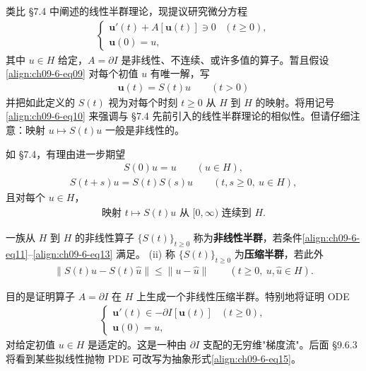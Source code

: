 \documentclass[../../main.tex]{subfiles}
\begin{document}
类比 \S7.4 中阐述的线性半群理论，现提议研究微分方程
\begin{align}
\begin{cases}
\mathbf{u}'(t)+A[\mathbf{u}(t)]\ni 0&(t\geqslant 0),\\
\mathbf{u}(0)=u,
\end{cases}\label{align:ch09-6-eq09}
\end{align}
其中 $u\in H$ 给定，$A=\partial I$ 是非线性、不连续、或许多值的算子。暂且假设\eqref{align:ch09-6-eq09} 对每个初值 $u$ 有唯一解，写
\begin{align}
\mathbf{u}(t)=S(t)u\qquad (t>0)\label{align:ch09-6-eq10}
\end{align}
并把如此定义的 $S(t)$ 视为对每个时刻 $t\geqslant 0$ 从 $H$ 到 $H$ 的映射。将用记号\eqref{align:ch09-6-eq10} 来强调与 \S7.4 先前引入的线性半群理论的相似性。但请仔细注意：映射 $u\mapsto S(t)u$ 一般是非线性的。

如 \S7.4，有理由进一步期望
\begin{align}
S(0)u=u\qquad (u\in H),\label{align:ch09-6-eq11}
\end{align}
\begin{align}
S(t+s)u=S(t)S(s)u\qquad (t,s\geqslant 0,\ u\in H),\label{align:ch09-6-eq12}
\end{align}
且对每个 $u\in H$，
\begin{align}
\text{映射 }t\mapsto S(t)u\text{ 从 }[0,\infty)\text{ 连续到 }H.\label{align:ch09-6-eq13}
\end{align}

\begin{definition}[i]\label{definition:ch09-6-非线性半群} 一族从 $H$ 到 $H$ 的非线性算子 $\{S(t)\}_{t\geqslant 0}$ 称为\textbf{非线性半群}，若条件\eqref{align:ch09-6-eq11}--\eqref{align:ch09-6-eq13} 满足。
(ii) 称 $\{S(t)\}_{t\geqslant 0}$ 为\textbf{压缩半群}，若此外
\begin{align}
\|S(t)u-S(t)\widehat{u}\|\leqslant\|u-\widehat{u}\|\qquad (t\geqslant 0,\ u,\widehat{u}\in H).\label{align:ch09-6-eq14}
\end{align}
\end{definition}

目的是证明算子 $A=\partial I$ 在 $H$ 上生成一个非线性压缩半群。特别地将证明 ODE
\begin{align}
\begin{cases}
\mathbf{u}'(t)\in-\partial I[\mathbf{u}(t)]&(t\geqslant 0),\\
\mathbf{u}(0)=u,
\end{cases}\label{align:ch09-6-eq15}
\end{align}
对给定初值 $u\in H$ 是适定的。这是一种由 $\partial I$ 支配的无穷维"梯度流"。后面 \S9.6.3 将看到某些拟线性抛物 PDE 可改写为抽象形式\eqref{align:ch09-6-eq15}。
\end{document}
